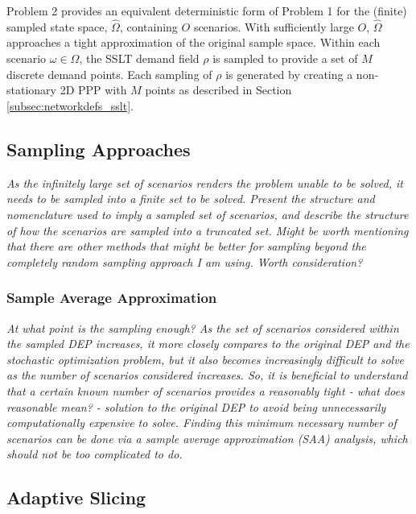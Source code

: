 \documentclass[12pt,dvipsnames]{report}
\begin{document}
Problem 2 provides an equivalent deterministic form of Problem 1 for the (finite) sampled state space, $\hat{\Omega}$, containing $O$ scenarios.  With sufficiently large $O$, $\hat{\Omega}$ approaches a tight approximation of the original sample space.  Within each scenario $\omega \in \hat{\Omega}$, the SSLT demand field $\rho$ is sampled to provide a set of $M$ discrete demand points.  Each sampling of $\rho$ is generated by creating a non-stationary 2D PPP with $M$ points as described in Section \ref{subsec:networkdefs_sslt}.

\subsection{Sampling Approaches} \label{subsec:dep_sampling}

\textit{As the infinitely large set of scenarios renders the problem unable to be solved, it needs to be sampled into a finite set to be solved.  Present the structure and nomenclature used to imply a sampled set of scenarios, and describe the structure of how the scenarios are sampled into a truncated set.  Might be worth mentioning that there are other methods that might be better for sampling beyond the completely random sampling approach I am using.  Worth consideration?}

\subsubsection{Sample Average Approximation} \label{subsubsec:dep_sampling_saa}

\textit{At what point is the sampling enough?  As the set of scenarios considered within the sampled DEP increases, it more closely compares to the original DEP and the stochastic optimization problem, but it also becomes increasingly difficult to solve as the number of scenarios considered increases.  So, it is beneficial to understand that a certain known number of scenarios provides a reasonably tight - what does reasonable mean? - solution to the original DEP to avoid being unnecessarily computationally expensive to solve.  Finding this minimum necessary number of scenarios can be done via a sample average approximation (SAA) analysis, which should not be too complicated to do.}

\subsection{Adaptive Slicing} \label{subsec:dep_slicing}
\end{document}

